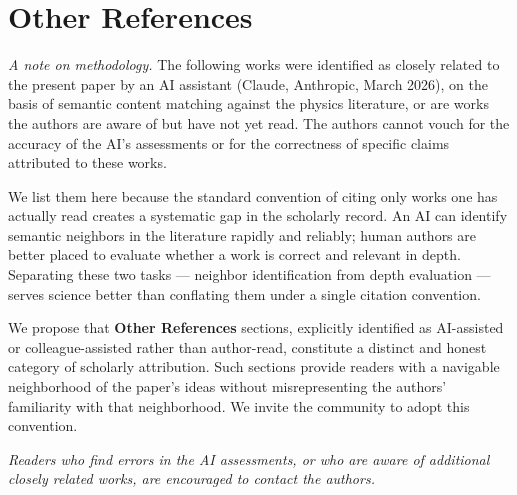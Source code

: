 \documentclass[12pt]{article}
\begin{document}
\section*{Other References}

\noindent\textit{A note on methodology.}
The following works were identified as closely related to the present
paper by an AI assistant (Claude, Anthropic, March 2026), on the basis
of semantic content matching against the physics literature, or are
works the authors are aware of but have not yet read.
The authors cannot vouch for the accuracy of the AI's assessments
or for the correctness of specific claims attributed to these works.

We list them here because the standard convention of citing only works
one has actually read creates a systematic gap in the scholarly record.
An AI can identify semantic neighbors in the literature rapidly and
reliably; human authors are better placed to evaluate whether a work
is correct and relevant in depth.
Separating these two tasks --- neighbor identification from depth
evaluation --- serves science better than conflating them under a
single citation convention.

We propose that \textbf{Other References} sections, explicitly
identified as AI-assisted or colleague-assisted rather than
author-read, constitute a distinct and honest category of scholarly
attribution.
Such sections provide readers with a navigable neighborhood of the
paper's ideas without misrepresenting the authors' familiarity with
that neighborhood.
We invite the community to adopt this convention.

\smallskip
\noindent\textit{Readers who find errors in the AI assessments, or who
are aware of additional closely related works, are encouraged to
contact the authors.}

\bigskip
\end{document}
